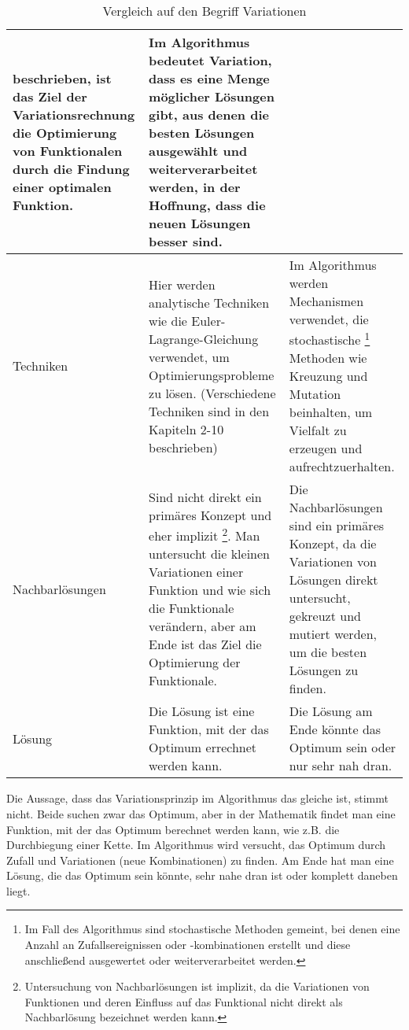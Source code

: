 \begin{table}
\begin{tabularx}{\textwidth}{|X|X|X|}
      beschrieben, ist das Ziel der Variationsrechnung die Optimierung von Funktionalen 
      durch die Findung einer optimalen Funktion.
       & Im Algorithmus bedeutet Variation, dass es eine Menge möglicher Lösungen gibt, 
      aus denen die besten Lösungen ausgewählt und weiterverarbeitet werden, in der 
      Hoffnung, dass die neuen Lösungen besser sind.
      \\ \hline
      Techniken  
       & Hier werden analytische Techniken wie die Euler-Lagrange-Gleichung verwendet, 
      um Optimierungsprobleme zu lösen. (Verschiedene Techniken sind in den Kapiteln 
      2-10 beschrieben)
       & Im Algorithmus werden Mechanismen verwendet, die stochastische 
      \footnote{
         Im Fall des Algorithmus sind stochastische Methoden gemeint, bei denen 
         eine Anzahl an Zufallsereignissen oder -kombinationen erstellt und 
         diese anschließend ausgewertet oder weiterverarbeitet werden.
      }
      Methoden wie Kreuzung und Mutation beinhalten, um Vielfalt zu erzeugen und aufrechtzuerhalten.
      \\ \hline
      Nachbarlösungen
       & Sind nicht direkt ein primäres Konzept und eher implizit \footnote{
         Untersuchung von Nachbarlösungen ist implizit, da die Variationen 
         von Funktionen und deren Einfluss auf das Funktional nicht direkt 
         als Nachbarlösung bezeichnet werden kann.
      }. Man untersucht die kleinen Variationen einer Funktion und wie sich 
      die Funktionale verändern, aber am Ende ist das Ziel die Optimierung 
      der Funktionale.
       & Die Nachbarlösungen sind ein primäres Konzept, da die Variationen
      von Lösungen direkt untersucht, gekreuzt und mutiert werden, um die 
      besten Lösungen zu finden.
      \\ \hline
      Lösung
       & Die Lösung ist eine Funktion, mit der das Optimum errechnet werden kann.
       & Die Lösung am Ende könnte das Optimum sein oder nur sehr nah dran.
      \\ \hline
   \end{tabularx}
   \caption{Vergleich auf den Begriff Variationen}
   \label{tab:example_bruteforce_cities}
\end{table}

Die Aussage, dass das Variationsprinzip im Algorithmus das gleiche ist, 
stimmt nicht. Beide suchen zwar das Optimum, aber in der Mathematik findet 
man eine Funktion, mit der das Optimum berechnet werden kann, wie z.B. 
die Durchbiegung einer Kette. Im Algorithmus wird versucht, das Optimum 
durch Zufall und Variationen (neue Kombinationen) zu finden. Am Ende 
hat man eine Lösung, die das Optimum sein könnte, sehr nahe dran ist 
oder komplett daneben liegt.
